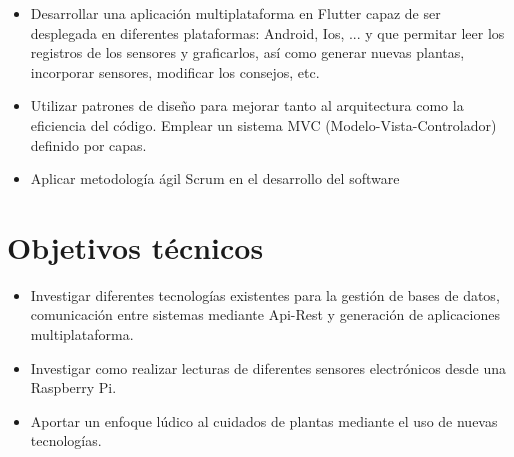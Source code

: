 \begin{itemize}
    \item Desarrollar una aplicación multiplataforma en Flutter capaz de ser desplegada en diferentes plataformas: Android, Ios, ... y que permitar leer los registros de los sensores y graficarlos, así como generar nuevas plantas, incorporar sensores, modificar los consejos, etc.
    
    \item Utilizar patrones de diseño para mejorar tanto al arquitectura como la eficiencia del código. Emplear un sistema MVC (Modelo-Vista-Controlador) definido por capas.
    
    \item Aplicar metodología ágil Scrum en el desarrollo del software 
    
\end{itemize}

\section{Objetivos técnicos}

\begin{itemize}

    \item Investigar diferentes tecnologías existentes para la gestión de bases de datos, comunicación entre sistemas mediante Api-Rest y generación de aplicaciones multiplataforma.
    
    \item Investigar como realizar lecturas de diferentes sensores electrónicos desde una Raspberry Pi.
    
    \item Aportar un enfoque lúdico al cuidados de plantas mediante el uso de nuevas tecnologías.

\end{itemize}